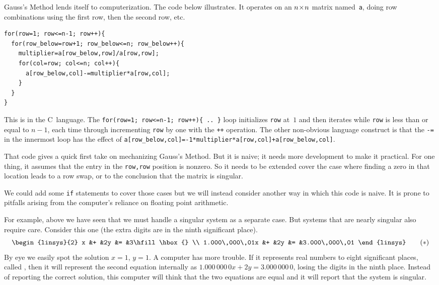 Gauss's Method lends itself to computerization.
The code below illustrates.
It operates on an $n \! \times \! n$ matrix named~\lstinline[style=inline]!a!, 
doing row combinations using the first row, then
the second row, etc.
\begin{lstlisting}
for(row=1; row<=n-1; row++){
  for(row_below=row+1; row_below<=n; row_below++){
    multiplier=a[row_below,row]/a[row,row];
    for(col=row; col<=n; col++){
      a[row_below,col]-=multiplier*a[row,col];
    }
  }
}
\end{lstlisting}
This is in the C~language.
The 
\lstinline[style=inline]!for(row=1; row<=n-1; row++){ .. }!
loop initializes \lstinline[style=inline]!row! at~$1$ and then iterates while
\lstinline[style=inline]!row! is less than or equal to $n-1$, each time through
incrementing \lstinline[style=inline]!row! by one with the 
\lstinline[style=inline]!++! operation.
The other non-obvious language 
construct is that the \lstinline[style=inline]!-=! in the innermost
loop has the effect of
\lstinline[style=inline]!a[row_below,col]=-1*multiplier*a[row,col]+a[row_below,col]!.

That code gives a quick first take on mechanizing Gauss's Method.
But it is naive; it needs more development to make it practical.
For one thing, it assumes that 
the entry in the
\lstinline[style=inline]!row,row! position is nonzero.
So it needs to be extended cover
the case where finding a zero in that location leads to a row swap, or to the
conclusion that the matrix is singular.

We could add some \lstinline[style=inline]!if! statements to cover those cases 
but we will instead consider another way in which this code is naive.
It is prone to pitfalls arising from the computer's reliance on 
floating point arithmetic.

For example, above we have seen that we must handle a singular system as
a separate case.
But systems that are nearly singular also require care.
Consider this one (the extra digits are in the ninth significant place).
\begin{equation*}
   \begin{linsys}{2}
                   x &+ &2y &= &3\hfill\hbox{}  \\
     1.000\,000\,01x &+ &2y &= &3.000\,000\,01
   \end{linsys}
   \tag{$*$}
\end{equation*}
By eye we easily spot the solution $x=1$, $y=1$.
A computer has more trouble.
If it represents real numbers to eight significant places, called 
, 
then it will represent the second
equation internally as $1.000\,000\,0x+2y=3.000\,000\,0$, losing the
digits in the ninth place.
Instead of reporting the correct solution, this computer will think that 
the two equations are equal and it will report that the system is 
singular.

